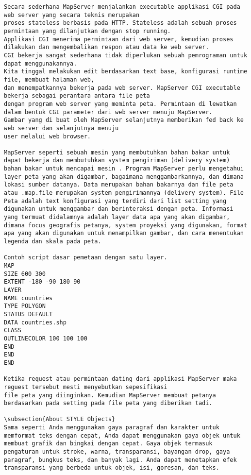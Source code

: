 \begin{verbatim}
Secara sederhana MapServer menjalankan executable applikasi CGI pada web server yang secara teknis merupakan 
proses stateless berbasis pada HTTP. Stateless adalah sebuah proses permintaan yang dilanjutkan dengan stop running. 
Applikasi CGI menerima permintaan dari web server, kemudian proses dilakukan dan mengembalikan respon atau data ke web server.
CGI bekerja sangat sederhana tidak diperlukan sebuah pemrograman untuk dapat menggunakannya. 
Kita tinggal melakukan edit berdasarkan text base, konfigurasi runtime file, membuat halaman web, 
dan menempatkannya bekerja pada web server. MapServer CGI executable bekerja sebagai perantara antara file peta 
dengan program web server yang meminta peta. Permintaan di lewatkan dalam bentuk CGI parameter dari web server menuju MapServer.
Gambar yang di buat oleh MapServer selanjutnya memberikan fed back ke web server dan selanjutnya menuju 
user melalui web browser.

MapServer seperti sebuah mesin yang membutuhkan bahan bakar untuk dapat bekerja dan membutuhkan system pengiriman (delivery system) bahan bakar untuk mencapai mesin . Program MapServer perlu mengetahui layer peta yang akan digambar, bagaimana menggambarkannya, dan dimana lokasi sumber datanya. Data merupakan bahan bakarnya dan file peta atau .map.file merupakan system pengirimannya (delivery system). File Peta adalah text konfigurasi yang terdiri dari list setting yang digunakan untuk menggambar dan berinteraksi dengan peta. Informasi yang termuat didalamnya adalah layer data apa yang akan digambar, dimana focus geografis petanya, system proyeksi yang digunakan, format apa yang akan digunakan untuk menampilkan gambar, dan cara menentukan legenda dan skala pada peta.

Contoh script dasar pemetaan dengan satu layer.
MAP
SIZE 600 300
EXTENT -180 -90 180 90
LAYER
NAME countries
TYPE POLYGON
STATUS DEFAULT
DATA countries.shp
CLASS
OUTLINECOLOR 100 100 100
END
END
END

Ketika request atau permintaan dating dari applikasi MapServer maka reguest tersebut mesti menyebutkan sepesifikasi 
file peta yang diinginkan. Kemudian MapServer membuat petanya berdasarkan pada setting pada file peta yang diberikan tadi.

\subsection{About STYLE Objects}
Sama seperti Anda menggunakan gaya paragraf dan karakter untuk memformat teks dengan cepat, Anda dapat menggunakan gaya objek untuk membuat grafik dan bingkai dengan cepat. Gaya objek termasuk pengaturan untuk stroke, warna, transparansi, bayangan drop, gaya paragraf, bungkus teks, dan banyak lagi. Anda dapat menetapkan efek transparansi yang berbeda untuk objek, isi, goresan, dan teks.


\end{verbatim}
